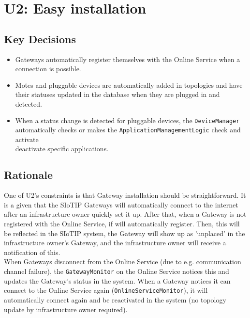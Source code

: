 \section{U2: Easy installation}

    \subsection*{Key Decisions}

        \begin{itemize}
        	\item Gateways automatically register themselves with the Online Service when a connection is possible.
        	\item Motes and pluggable devices are automatically added in topologies and have their statuses updated
                  in the database when they are plugged in and detected.
            \item When a status change is detected for pluggable devices, the \texttt{DeviceManager} automatically
                  checks or makes the \texttt{ApplicationManagementLogic} check and activate\\deactivate
                  specific applications.
        \end{itemize}

    \subsection*{Rationale}
        One of U2's constraints is that Gateway installation should be straightforward.
        It is a given that the SIoTIP Gateways will automatically connect to the internet
        after an infrastructure owner quickly set it up. After that, when a Gateway
        is not registered with the Online Service, if will automatically register.
        Then, this will be reflected in the SIoTIP system, the Gateway will show up
        as 'unplaced' in the infrastructure owner's Gateway, and the infrastructure
        owner will receive a notification of this. \\
        When Gateways disconnect from the Online Service (due to e.g. communication channel failure),
        the \texttt{GatewayMonitor} on the Online Service notices this and updates the Gateway's
        status in the system. When a Gateway notices it can connect to the Online Service again
        (\texttt{OnlineServiceMonitor}), it will automatically connect again and be reactivated
        in the system (no topology update by infrastructure owner required).\\

